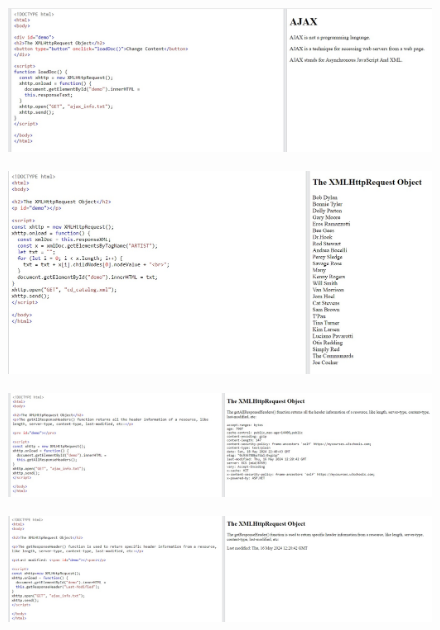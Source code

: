 \documentclass{article}
\begin{document}
\begin{itemize}
		\begin{figure}[H]
			\centering
			\includegraphics[width=1.0\textwidth,keepaspectratio]{img/A11.jpg}
		\end{figure}
		\begin{figure}[H]
			\centering
			\includegraphics[width=1.0\textwidth,keepaspectratio]{img/A12.jpg}
		\end{figure}

		\begin{figure}[H]
			\centering
			\includegraphics[width=1.0\textwidth,keepaspectratio]{img/A13.jpg}
		\end{figure}


		\begin{figure}[H]
			\centering
			\includegraphics[width=1.0\textwidth,keepaspectratio]{img/A14.jpg}
		\end{figure}


\end{itemize}
\end{document}
